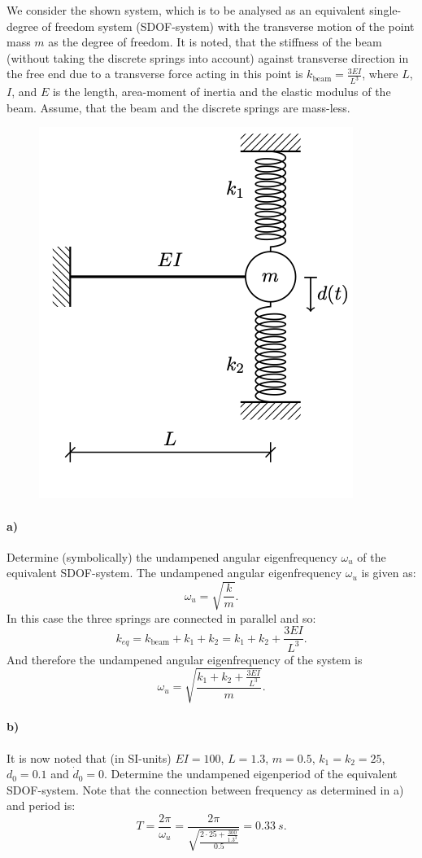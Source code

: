 
We consider the shown system, which is to be analysed as an equivalent single-degree of freedom system (SDOF-system) with the transverse motion of the point mass $m$ as the degree of freedom. It is noted, that the stiffness of the beam (without taking the discrete springs into account) against transverse direction in the free end due to a transverse force acting in this point is $k_{\mathrm{beam}} = \frac{3EI}{L^3}$, where $L$, $I$, and $E$ is the length, area-moment of inertia and the elastic modulus of the beam. Assume, that the beam and the discrete springs are mass-less.

\begin{figure} [ht]
  \centering
  \includegraphics[width=0.35\linewidth]{./figures/f2_1.png}
\end{figure}

\paragraph{a)} Determine (symbolically) the undampened angular eigenfrequency $\omega_u$ of the equivalent SDOF-system.
\bigbreak
The undampened angular eigenfrequency $\omega_u$ is given as:
\[ 
\omega_u = \sqrt{\frac{k}{m}}
.\]
In this case the three springs are connected in parallel and so:
\[ 
  k_{eq} = k_{\mathrm{beam}} + k_1 + k_2 = k_1 + k_2 + \frac{3EI}{L^3}
.\]
And therefore the undampened angular eigenfrequency of the system is
\[ 
  \omega_u = \sqrt{\frac{k_1 + k_2 + \frac{3EI}{L^3}}{m}}
.\]


\paragraph{b)}
It is now noted that (in SI-units) $EI = 100$, $L = \num{1,3}$, $m = \num{0,5}$, $k_1 = k_2 = 25$, $d_0 = \num{0.1}$ and $\dot{d}_0 = 0$. Determine the undampened eigenperiod of the equivalent SDOF-system.
\bigbreak
Note that the connection between frequency as determined in a) and period is:
\[ 
T = \frac{2\pi}{\omega_u} = \frac{2\pi}{\sqrt{\frac{2 \cdot 25 + \frac{300}{\num{1,3}^3}}{\num{0,5} }}} = \qty{0,33}{s} 
.\]


